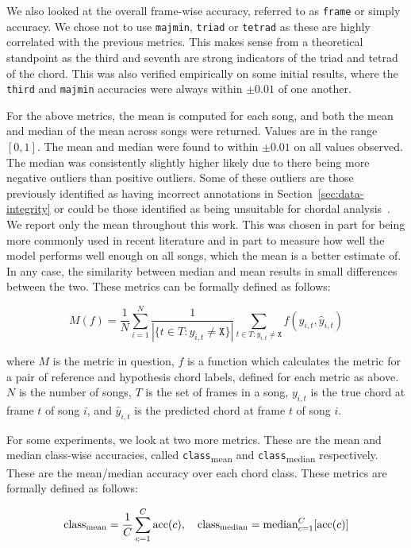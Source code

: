 We also looked at the overall frame-wise accuracy, referred to as \texttt{frame} or simply accuracy. We chose not to use \texttt{majmin}, \texttt{triad} or \texttt{tetrad} as these are highly correlated with the previous metrics. This makes sense from a theoretical standpoint as the third and seventh are strong indicators of the triad and tetrad of the chord. This was also verified empirically on some initial results, where the \texttt{third} and \texttt{majmin} accuracies were always within $\pm 0.01$ of one another.

For the above metrics, the mean is computed for each song, and both the mean and median of the mean across songs were returned. Values are in the range $[0,1]$. The mean and median were found to within $\pm 0.01$ on all values observed. The median was consistently slightly higher likely due to there being more negative outliers than positive outliers. Some of these outliers are those previously identified as having incorrect annotations in Section~\ref{sec:data-integrity} or could be those identified as being unsuitable for chordal analysis~\citep{FourTimelyInsights}. We report only the mean throughout this work. This was chosen in part for being more commonly used in recent literature and in part to measure how well the model performs well enough on all songs, which the mean is a better estimate of. In any case, the similarity between median and mean results in small differences between the two. These metrics can be formally defined as follows:

\[ M(f) = \frac{1}{N} \sum_{i=1}^{N} \frac{1}{|\{t\in T : y_{i,t} \neq \texttt{X}\}|} \sum_{t\in T : y_{i,t} \neq \texttt{X}} f(y_{i,t}, \hat{y}_{i,t})\]

where $M$ is the metric in question, $f$ is a function which calculates the metric for a pair of reference and hypothesis chord labels, defined for each metric as above. $N$ is the number of songs, $T$ is the set of frames in a song, $y_{i,t}$ is the true chord at frame $t$ of song $i$, and $\hat{y}_{i,t}$ is the predicted chord at frame $t$ of song $i$.

For some experiments, we look at two more metrics. These are the mean and median class-wise accuracies, called \texttt{class}\textsubscript{mean} and \texttt{class}\textsubscript{median} respectively. These are the mean/median accuracy over each chord class. These metrics are formally defined as follows:

\[
\text{class}\textsubscript{mean} = \frac{1}{C} \sum_{c=1}^{C} \text{acc}(c), \quad
\text{class}\textsubscript{median} = \text{median}_{c=1}^{C} [\text{acc}(c)]
\]

